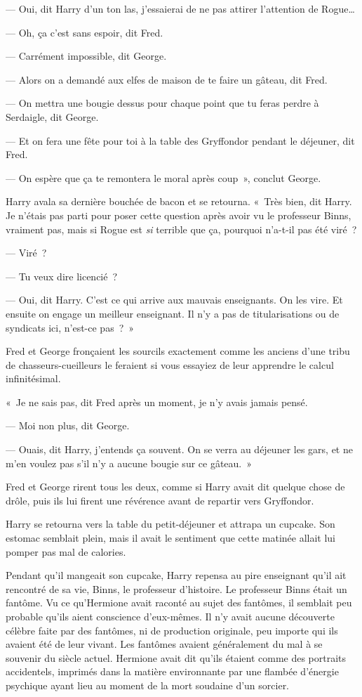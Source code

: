 --- Oui, dit Harry d'un ton las, j'essaierai de ne pas attirer l'attention de Rogue…

--- Oh, ça c'est sans espoir, dit Fred.

--- Carrément impossible, dit George.

--- Alors on a demandé aux elfes de maison de te faire un gâteau, dit Fred.

--- On mettra une bougie dessus pour chaque point que tu feras perdre à Serdaigle, dit George.

--- Et on fera une fête pour toi à la table des Gryffondor pendant le déjeuner, dit Fred.

--- On espère que ça te remontera le moral après coup~», conclut George.

Harry avala sa dernière bouchée de bacon et se retourna.
«~Très bien, dit Harry.
Je n'étais pas parti pour poser cette question après avoir vu le professeur Binns, vraiment pas, mais si Rogue est \emph{si} terrible que ça, pourquoi n'a-t-il pas été viré~?

--- Viré~?

--- Tu veux dire licencié~?

--- Oui, dit Harry.
C'est ce qui arrive aux mauvais enseignants.
On les vire.
Et ensuite on engage un meilleur enseignant.
Il n'y a pas de titularisations ou de syndicats ici, n'est-ce pas~?~»

Fred et George fronçaient les sourcils exactement comme les anciens d'une tribu de chasseurs-cueilleurs le feraient si vous essayiez de leur apprendre le calcul infinitésimal.

«~Je ne sais pas, dit Fred après un moment, je n'y avais jamais pensé.

--- Moi non plus, dit George.

--- Ouais, dit Harry, j'entends ça souvent.
On se verra au déjeuner les gars, et ne m'en voulez pas s'il n'y a aucune bougie sur ce gâteau.~»

Fred et George rirent tous les deux, comme si Harry avait dit quelque chose de drôle, puis ils lui firent une révérence avant de repartir vers Gryffondor.

Harry se retourna vers la table du petit-déjeuner et attrapa un cupcake.
Son estomac semblait plein, mais il avait le sentiment que cette matinée allait lui pomper pas mal de calories.

Pendant qu'il mangeait son cupcake, Harry repensa au pire enseignant qu'il ait rencontré de sa vie, Binns, le professeur d'histoire.
Le professeur Binns était un fantôme.
Vu ce qu'Hermione avait raconté au sujet des fantômes, il semblait peu probable qu'ils aient conscience d'eux-mêmes.
Il n'y avait aucune découverte célèbre faite par des fantômes, ni de production originale, peu importe qui ils avaient été de leur vivant.
Les fantômes avaient généralement du mal à se souvenir du siècle actuel.
Hermione avait dit qu'ils étaient comme des portraits accidentels, imprimés dans la matière environnante par une flambée d'énergie psychique ayant lieu au moment de la mort soudaine d'un sorcier.

